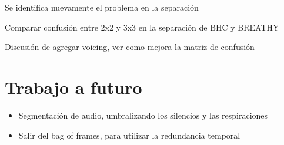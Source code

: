 \documentclass{article}
\begin{document}
Se identifica nuevamente el problema en la separación

Comparar confusión entre 2x2 y 3x3 en la separación de BHC y BREATHY

Discusión de agregar voicing, ver como mejora la matriz de confusión 

\subsubsection{}


\section{Trabajo a futuro}

\begin{itemize} 
  \item Segmentación de audio, umbralizando los silencios y las respiraciones 
  \item Salir del bag of frames, para utilizar la redundancia temporal
\end{itemize}


\newpage




\end{document}
